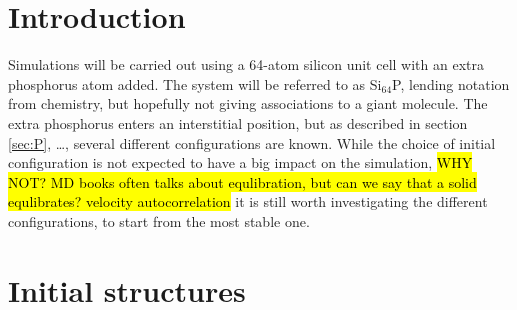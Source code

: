 \documentclass[11pt,bibliography=totoc,index=totoc]{scrbook}   %
\newcommand{\comment}[1]{\hl{#1}}
\begin{document}
%
\section{Introduction}\label{sec:resultsIntro}
%

Simulations will be carried out using a 64-atom silicon unit cell with an extra phosphorus atom added. 
The system will be referred to as Si$_{64}$P, lending notation from chemistry, but hopefully not giving associations to a giant molecule.
The extra phosphorus enters an interstitial position, but as described in section \ref{sec:P}, \ldots, several different configurations are known.
While the choice of initial configuration is not expected to have a big impact on the simulation, \comment{WHY NOT? MD books often talks about equlibration, but can we say that a solid equlibrates? velocity autocorrelation}
it is still worth investigating the different configurations, to start from the most stable one.

%
\section{Initial structures}\label{sec:structures}
%

\end{document}
